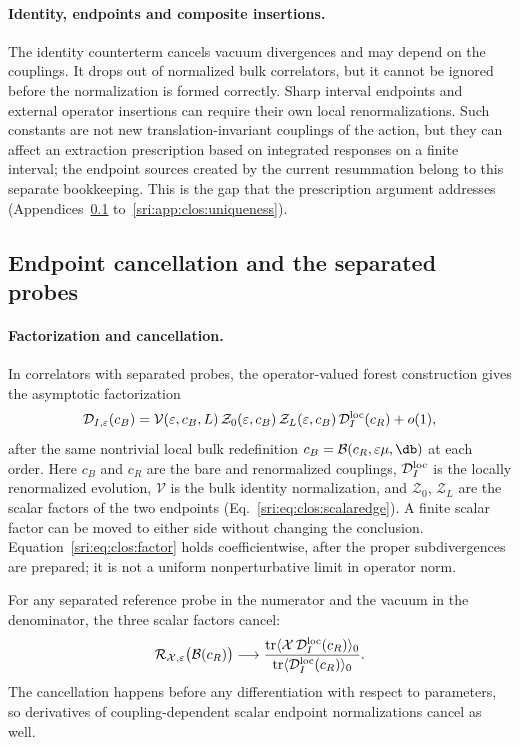 \paragraph{Identity, endpoints and composite insertions.} The identity counterterm cancels vacuum divergences and may
depend on the couplings. It drops out of normalized bulk correlators, but it cannot be ignored before the normalization
is formed correctly. Sharp interval endpoints and external operator insertions can require their own local
renormalizations. Such constants are not new translation-invariant couplings of the action, but they can affect an
extraction prescription based on integrated responses on a finite interval; the endpoint sources created by the
current resummation belong to this separate bookkeeping. This is the gap that the prescription argument addresses
(Appendices~\ref{sri:app:clos:endpoint} to~\ref{sri:app:clos:uniqueness}).

\subsection{Endpoint cancellation and the separated probes}\label{sri:app:clos:endpoint}
\paragraph{Factorization and cancellation.} In correlators with separated probes, the operator-valued forest
construction gives the asymptotic factorization
\begin{equation}
 \mathcal D_{I,\varepsilon}(c_B)=\mathcal V(\varepsilon,c_B,L)\,\mathcal Z_0(\varepsilon,c_B)\,
 \mathcal Z_L(\varepsilon,c_B)\,\mathcal D_I^{\rm loc}(c_R)+o(1),
 \label{sri:eq:clos:factor}
\end{equation}
after the same nontrivial local bulk redefinition $c_B=\mathcal B(c_R,\varepsilon\mu,\db)$ at each order. Here $c_B$
and $c_R$ are the bare and renormalized couplings, $\mathcal D_I^{\rm loc}$ is the locally renormalized evolution,
$\mathcal V$ is the bulk identity normalization, and $\mathcal Z_0$, $\mathcal Z_L$ are the scalar factors of the two
endpoints (Eq.~\eqref{sri:eq:clos:scalaredge}). A finite scalar factor can be moved to either side without changing the
conclusion. Equation~\eqref{sri:eq:clos:factor} holds coefficientwise, after the proper subdivergences are prepared; it is
not a uniform nonperturbative limit in operator norm.

For any separated reference probe in the numerator and the vacuum in the denominator, the three scalar factors cancel:
\begin{equation}
 \mathcal R_{\mathcal X,\varepsilon}\bigl(\mathcal B(c_R)\bigr)\longrightarrow
 \frac{\operatorname{tr}\langle\mathcal X\,\mathcal D_I^{\rm loc}(c_R)\rangle_0}
 {\operatorname{tr}\langle\mathcal D_I^{\rm loc}(c_R)\rangle_0}.
 \label{sri:eq:clos:cancel}
\end{equation}
The cancellation happens before any differentiation with respect to parameters, so derivatives of coupling-dependent
scalar endpoint normalizations cancel as well.

